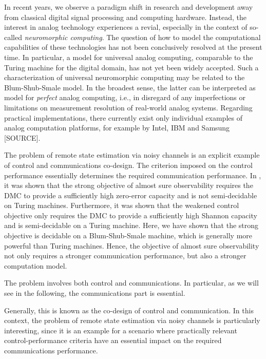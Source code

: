\documentclass[conference]{IEEEtran}
\newcommand{\sdummy}{{\color{red}[SOURCE]}}
\begin{document}
	In recent years, we observe a paradigm shift in research and development away from classical digital signal processing and computing hardware.
	Instead, the interest in analog technology experiences a revial, especially in the context of so-called \emph{neuromorphic computing}. 
	The question of how to model the computational capabilities of these technologies has not been conclusively resolved at the present time.
	In particular, a model for universal analog computing, comparable to the Turing machine for the digital domain, has not yet been widely accepted. 
	Such a characterization of universal neuromorphic computing may be related to the Blum-Shub-Smale model. In the broadest sense, the latter can be
	interpreted as model for \emph{perfect} analog computing, i.e., in disregard of any imperfections or limitations on measurement resolution of real-world analog systems.
	Regarding practical implementations, there currently exist only individual examples of analog computation platforms, for example by Intel, IBM and Samsung \sdummy.

	{\color{violet} The problem of remote state estimation via noisy channels is an explicit example of control and communications co-design. The criterion imposed on the control performance
	essentially determines the required communication performance. In \cite{MS07,BoBoDe21TAC}, it was shown that the strong objective of almost sure observability requires the DMC to provide a sufficiently high
	zero-error capacity and is not semi-decidable on Turing machines. Furthermore, it was shown that the weakened control objective only requires the DMC to provide a sufficiently high
	Shannon capacity and is semi-decidable on a Turing machine. Here, we have shown that the strong objective is decidable on a Blum-Shub-Smale machine, which is generally more powerful than
	Turing machines. Hence, the objective of almost sure observability not only requires a stronger communication performance, but also a stronger computation model.}
	
	{\color{violet} The problem involves both control and communications. In particular, as we will see in the following, the communications part is essential.}  
	
	{\color{violet} Generally, this is known as the co-design of control and communication. In this context, the problem of remote state estimation via noisy channels is particularly interesting,
	since it is an example for a scenario where practically relevant control-performance criteria have an essential impact on the required communications performance.}
	
\end{document}
